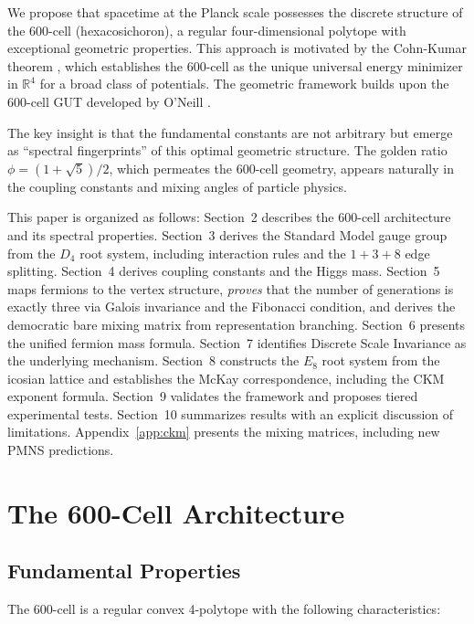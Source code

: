 \documentclass[12pt,a4paper]{article}
\begin{document}
We propose that spacetime at the Planck scale possesses the discrete structure of the 600-cell (hexacosichoron), a regular four-dimensional polytope with exceptional geometric properties. This approach is motivated by the Cohn-Kumar theorem \cite{cohn2007,cohn2011}, which establishes the 600-cell as the unique universal energy minimizer in $\mathbb{R}^4$ for a broad class of potentials. The geometric framework builds upon the 600-cell GUT developed by O'Neill \cite{oneill2025gut,oneill2023binary}.

The key insight is that the fundamental constants are not arbitrary but emerge as ``spectral fingerprints'' of this optimal geometric structure. The golden ratio $\phi = (1+\sqrt{5})/2$, which permeates the 600-cell geometry, appears naturally in the coupling constants and mixing angles of particle physics.

This paper is organized as follows: Section~2 describes the 600-cell architecture and its spectral properties. Section~3 derives the Standard Model gauge group from the $D_4$ root system, including interaction rules and the $1+3+8$ edge splitting. Section~4 derives coupling constants and the Higgs mass. Section~5 maps fermions to the vertex structure, \emph{proves} that the number of generations is exactly three via Galois invariance and the Fibonacci condition, and derives the democratic bare mixing matrix from representation branching. Section~6 presents the unified fermion mass formula. Section~7 identifies Discrete Scale Invariance as the underlying mechanism. Section~8 constructs the $E_8$ root system from the icosian lattice and establishes the McKay correspondence, including the CKM exponent formula. Section~9 validates the framework and proposes tiered experimental tests. Section~10 summarizes results with an explicit discussion of limitations. Appendix~\ref{app:ckm} presents the mixing matrices, including new PMNS predictions.

\section{The 600-Cell Architecture}

\subsection{Fundamental Properties}

The 600-cell is a regular convex 4-polytope with the following characteristics:
\end{document}
